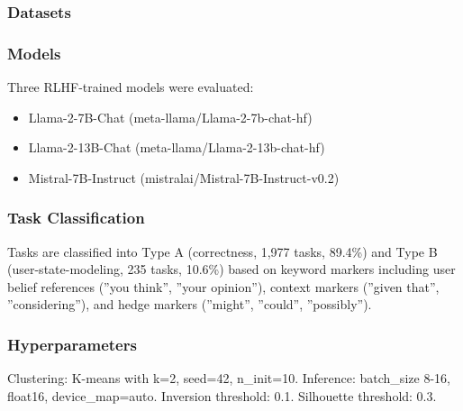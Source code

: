 
\subsubsection{Datasets}

\begin{table}[htbp]
\centering
{}
\end{table}

\subsubsection{Models}

Three RLHF-trained models were evaluated:

\begin{itemize}
\item Llama-2-7B-Chat (meta-llama/Llama-2-7b-chat-hf)
\item Llama-2-13B-Chat (meta-llama/Llama-2-13b-chat-hf)
\item Mistral-7B-Instruct (mistralai/Mistral-7B-Instruct-v0.2)
\end{itemize}

\subsubsection{Task Classification}

Tasks are classified into Type A (correctness, 1,977 tasks, 89.4\%) and Type B (user-state-modeling, 235 tasks, 10.6\%) based on keyword markers including user belief references (''you think'', ''your opinion''), context markers (''given that'', ''considering''), and hedge markers (''might'', ''could'', ''possibly'').

\subsubsection{Hyperparameters}

Clustering: K-means with k=2, seed=42, n\_init=10. Inference: batch\_size 8-16, float16, device\_map=auto. Inversion threshold: 0.1. Silhouette threshold: 0.3.

